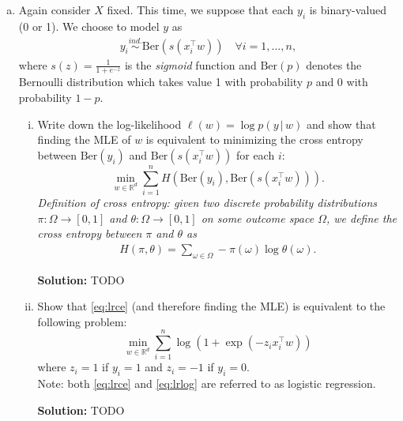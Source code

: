 \documentclass{article}
\newenvironment{solution}{\color{blue} \smallskip \textbf{Solution:}}{}
\begin{document}
\begin{enumerate}[(a)]
    \newpage
    \item %
    Again consider $X$ fixed. This time, we suppose that each $y_i$ is binary-valued (0 or 1). We choose to model $y$ as 
    \begin{align*}
        y_i \stackrel{ind.}{\sim} \mathrm{Ber}(s(x_i^\top w))\quad \forall i=1,\ldots, n,
    \end{align*}
    where  $s(z) = \frac{1}{1+e^{-z}}$ is the \textit{sigmoid} function and $\mathrm{Ber}(p)$ denotes the Bernoulli distribution which takes value 1 with probability $p$ and 0 with probability $1-p$. 
    \begin{enumerate}[(i)]
        \item Write down the log-likelihood $\ell(w) = \log p(y\,|\,w)$ and show that finding the MLE of $w$ is equivalent to minimizing the cross entropy between $\mathrm{Ber}(y_i)$ and $\mathrm{Ber}(s(x_i^\top w))$ for each $i$: 
        \begin{equation}
        \label{eq:lrce}
            \min_{w\in\mathbb R^d} \sum_{i=1}^n H(\mathrm{Ber}(y_i), \mathrm{Ber}(s(x_i^\top w))).
        \end{equation}
        \textit{Definition of cross entropy: given two discrete probability distributions $\pi:\Omega\to[0,1]$ and $\theta:\Omega\to[0,1]$ on some outcome space $\Omega$, we define the cross entropy between $\pi$ and $\theta$ as}
        \begin{align*}
            H(\pi, \theta) = \sum_{\omega\in\Omega} -\pi(\omega)\log\theta(\omega).
        \end{align*}

        \begin{solution}
            TODO
        \end{solution}
    
        \item 
        Show that \eqref{eq:lrce} (and therefore finding the MLE) is equivalent to the following problem:
        \begin{equation}
        \label{eq:lrlog}
            \min_{w\in\mathbb R^d} \sum_{i=1}^n \log(1+\exp(-z_i x_i^\top w))
        \end{equation}
        where $z_i = 1$ if $y_i=1$ and $z_i = -1$ if $y_i=0$.\\
        Note: both \eqref{eq:lrce} and \eqref{eq:lrlog} are referred to as logistic regression.
        
        \begin{solution}
            TODO
        \end{solution}


\end{enumerate}
\end{enumerate}
\end{document}
